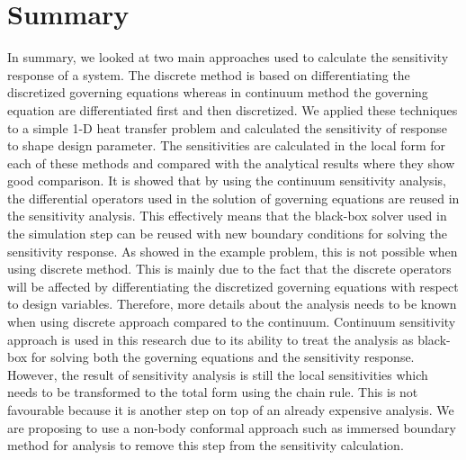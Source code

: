 \section{Summary}
In summary, we looked at two main approaches used to calculate the sensitivity response of a system. The discrete method is based on differentiating the discretized governing equations whereas in continuum method the governing equation are differentiated first and then discretized. We applied these techniques to a simple 1-D heat transfer problem and calculated the sensitivity of response to shape design parameter. The sensitivities are calculated in the local form for each of these methods and compared with the analytical results where they show good comparison. It is showed that by using the continuum sensitivity analysis, the differential operators used in the solution of governing equations are reused in the sensitivity analysis. This effectively means that the black-box solver used in the simulation step can be reused with new boundary conditions for solving the sensitivity response. As showed in the example problem, this is not possible when using discrete method. This is mainly due to the fact that the discrete operators will be affected by differentiating the discretized governing equations with respect to design variables. Therefore, more details about the analysis needs to be known when using discrete approach compared to the continuum. Continuum sensitivity approach is used in this research due to its ability to treat the analysis as black-box for solving both the governing equations and the sensitivity response. However, the result of sensitivity analysis is still the local sensitivities which needs to be transformed to the total form using the chain rule. This is not favourable because it is another step on top of an already expensive analysis. We are proposing to use a non-body conformal approach such as immersed boundary method for analysis to remove this step from the sensitivity calculation.
